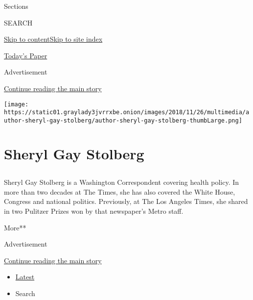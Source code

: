 Sections

SEARCH

\protect\hyperlink{site-content}{Skip to
content}\protect\hyperlink{site-index}{Skip to site index}

\href{https://myaccount.nytimes3xbfgragh.onion/auth/login?response_type=cookie\&client_id=vi}{}

\href{https://www.nytimes3xbfgragh.onion/section/todayspaper}{Today's
Paper}

Advertisement

\protect\hyperlink{after-top}{Continue reading the main story}

\texttt{[image: https://static01.graylady3jvrrxbe.onion/images/2018/11/26/multimedia/author-sheryl-gay-stolberg/author-sheryl-gay-stolberg-thumbLarge.png]}

\hypertarget{sheryl-gay-stolberg}{%
\section{Sheryl Gay Stolberg}\label{sheryl-gay-stolberg}}

\subsection{}

Sheryl Gay Stolberg is a Washington Correspondent covering health
policy. In more than two decades at The Times, she has also covered the
White House, Congress and national politics. Previously, at The Los
Angeles Times, she shared in two Pulitzer Prizes won by that newspaper's
Metro staff.

More**

Advertisement

\protect\hyperlink{after-mid1}{Continue reading the main story}

\begin{itemize}
\tightlist
\item
  \protect\hyperlink{stream-panel}{Latest}
\item
  Search
\end{itemize}

